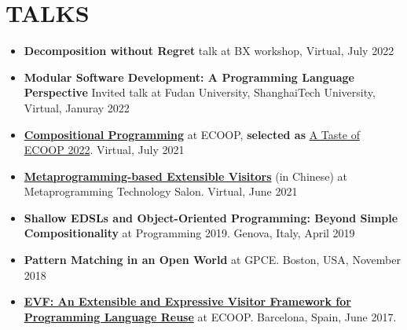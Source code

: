 \documentclass[paper=letter,fontsize=11pt]{scrartcl} %
\newcommand{\NewPart}[2]{\section*{\uppercase{#1} #2}}
\begin{document}
\NewPart{Talks}{}
\begin{itemize}
\item {\textbf{Decomposition without Regret}} talk at BX workshop, Virtual, July 2022
\item {\textbf{Modular Software Development: A Programming Language Perspective}} Invited talk at Fudan University, ShanghaiTech University, Virtual, Januray 2022
\item \href{https://www.youtube.com/watch?v=fBlHIXWIPhw}{\textbf{Compositional Programming}} at ECOOP, \textbf{selected as} \href{https://2021.ecoop.org/track/ecoop-2021-ecoop-research-papers#event-overview}{A Taste of ECOOP 2022}. Virtual, July 2021
\item \href{https://www.bilibili.com/s/video/BV1Cy4y1M7xC}{\textbf{Metaprogramming-based Extensible Visitors}} (in Chinese) at Metaprogramming Technology Salon. Virtual, June 2021
\item \textbf{Shallow EDSLs and Object-Oriented Programming: Beyond Simple Compositionality} at Programming 2019. Genova, Italy, April 2019
\item \textbf{Pattern Matching in an Open World} at GPCE. Boston, USA, November 2018
\item \href{https://www.youtube.com/watch?v=ibGaxqNNfrs}{\textbf{EVF: An Extensible and Expressive Visitor Framework for Programming Language Reuse}} at ECOOP. Barcelona, Spain, June 2017.
\end{itemize}
\end{document}
